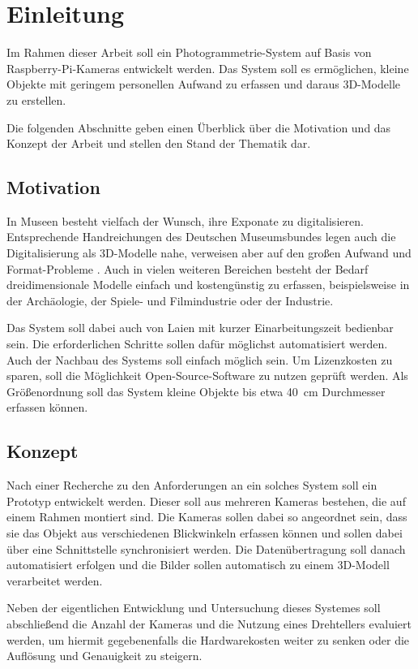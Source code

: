 \documentclass[./00PhotoBox]{subfiles}
\begin{document}
\chapter{Einleitung}

Im Rahmen dieser Arbeit soll ein Photogrammetrie-System auf Basis von Raspberry-Pi-Kameras entwickelt werden. Das System soll es ermöglichen, kleine Objekte mit geringem personellen Aufwand zu erfassen und daraus 3D-Modelle zu erstellen.

Die folgenden Abschnitte geben einen Überblick über die Motivation und das Konzept der Arbeit und stellen den Stand der Thematik dar.

\section{Motivation}

In Museen besteht vielfach der Wunsch, ihre Exponate zu digitalisieren. Entsprechende Handreichungen des Deutschen Museumsbundes legen auch die Digitalisierung als 3D-Modelle nahe, verweisen aber auf den großen Aufwand und Format-Probleme \citep[S. 43]{handreichung_digital}.
Auch in vielen weiteren Bereichen besteht der Bedarf dreidimensionale Modelle einfach und kostengünstig zu erfassen, beispielsweise in der Archäologie, der Spiele- und Filmindustrie oder der Industrie. 

Das System soll dabei auch von Laien mit kurzer Einarbeitungszeit bedienbar sein. Die erforderlichen Schritte sollen dafür möglichst automatisiert werden. Auch der Nachbau des Systems soll einfach möglich sein. Um Lizenzkosten zu sparen, soll die Möglich\-keit Open-Source-Software zu nutzen geprüft werden. Als Größenordnung soll das System kleine Objekte bis etwa 40~cm Durchmesser erfassen können.

\section{Konzept}
Nach einer Recherche zu den Anforderungen an ein solches System soll ein Prototyp entwickelt werden. Dieser soll aus mehreren Kameras bestehen, die auf einem Rahmen montiert sind. Die Kameras sollen dabei so angeordnet sein, dass sie das Objekt aus verschiedenen Blickwinkeln erfassen können und sollen dabei über eine Schnittstelle synchronisiert werden. Die Datenübertragung soll danach automatisiert erfolgen und die Bilder sollen automatisch zu einem 3D-Modell verarbeitet werden.

Neben der eigentlichen Entwicklung und Untersuchung dieses Systemes soll abschließend die Anzahl der Kameras und die Nutzung eines Drehtellers evaluiert werden, um hiermit gegebenenfalls die Hardwarekosten weiter zu senken oder die Auflösung und Genauigkeit zu steigern.
\end{document}
